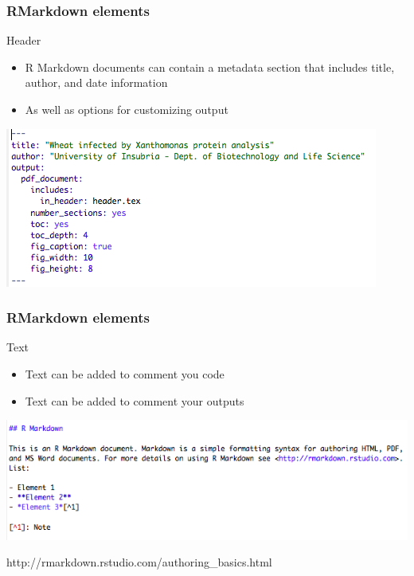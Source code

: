 \documentclass{beamer}
\begin{document}
\begin{frame}
    \frametitle{RMarkdown elements}
    \centering \Large Header
    \normalsize
    	\begin{itemize}
		\item R Markdown documents can contain a metadata section that includes title, author, and date information 
		\item As well as options for customizing output
	\end{itemize}
	\begin{center}	\includegraphics[scale=0.6]{figures/RMarkdown_hearder.png} \end{center}
    
\end{frame}

\begin{frame}
    \frametitle{RMarkdown elements}
    \centering \Large Text
    \normalsize
    	\begin{itemize}
		\item Text can be added to comment you code
		\item Text can be added to comment your outputs
	\end{itemize}
	\begin{center}	\includegraphics[scale=0.6]{figures/RMarkdown_text.png} \end{center}
	\small http://rmarkdown.rstudio.com/authoring\_basics.html
\end{frame}
\end{document}
